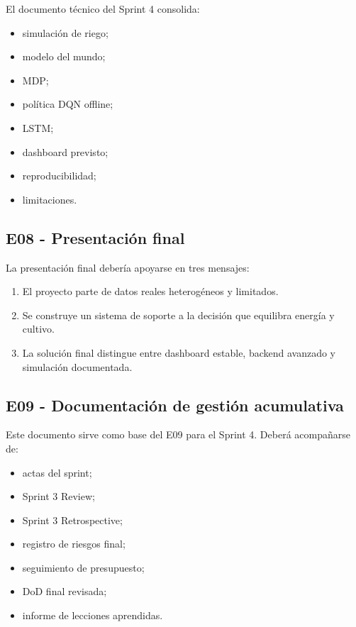 \documentclass[11pt,a4paper]{article}
\begin{document}
El documento técnico del Sprint 4 consolida:

\begin{itemize}
    \item simulación de riego;
    \item modelo del mundo;
    \item MDP;
    \item política DQN offline;
    \item LSTM;
    \item dashboard previsto;
    \item reproducibilidad;
    \item limitaciones.
\end{itemize}

\subsection{E08 - Presentación final}

La presentación final debería apoyarse en tres mensajes:

\begin{enumerate}
    \item El proyecto parte de datos reales heterogéneos y limitados.
    \item Se construye un sistema de soporte a la decisión que equilibra energía y cultivo.
    \item La solución final distingue entre dashboard estable, backend avanzado y simulación documentada.
\end{enumerate}

\subsection{E09 - Documentación de gestión acumulativa}

Este documento sirve como base del E09 para el Sprint 4. Deberá acompañarse de:

\begin{itemize}
    \item actas del sprint;
    \item Sprint 3 Review;
    \item Sprint 3 Retrospective;
    \item registro de riesgos final;
    \item seguimiento de presupuesto;
    \item DoD final revisada;
    \item informe de lecciones aprendidas.
\end{itemize}
\end{document}
